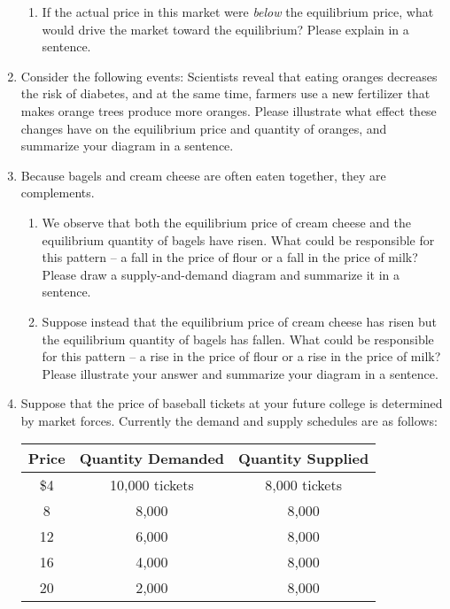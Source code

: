 \documentclass{article}
\begin{document}
\begin{enumerate}
\begin{enumerate}
	\item If the actual price in this market were \textit{below} the equilibrium price, what would drive the market toward the equilibrium? Please explain in a sentence.
	
	\end{enumerate}

\item Consider the following events: Scientists reveal that eating oranges decreases the risk of diabetes, and at the same time, farmers use a new fertilizer that makes orange trees produce more oranges. Please illustrate what effect these changes have on the equilibrium price and quantity of oranges, and summarize your diagram in a sentence.

\item Because bagels and cream cheese are often eaten together, they are complements.

	\begin{enumerate}
	
	\item We observe that both the equilibrium price of cream cheese and the equilibrium quantity of bagels have risen. What could be responsible for this pattern -- a fall in the price of flour or a fall in the price of milk? Please draw a supply-and-demand diagram and summarize it in a sentence.
	
	\item Suppose instead that the equilibrium price of cream cheese has risen but the equilibrium quantity of bagels has fallen. What could be responsible for this pattern -- a rise in the price of flour or a rise in the price of milk? Please illustrate your answer and summarize your diagram in a sentence. 
	
	\end{enumerate}
	
\item Suppose that the price of baseball tickets at your future college is determined by market forces. Currently the demand and supply schedules are as follows:

	\begin{center}
	\begin{tabular}{c c c}
	\textbf{Price} & \textbf{Quantity Demanded} & \textbf{Quantity Supplied} \\
	\hline
	\$4 & 10,000 tickets & 8,000 tickets \\
	8 & 8,000 & 8,000 \\
	12 & 6,000 & 8,000 \\
	16 & 4,000 & 8,000 \\
	20 & 2,000 & 8,000
	\end{tabular}
	\end{center}
	

\end{enumerate}
\end{document}
